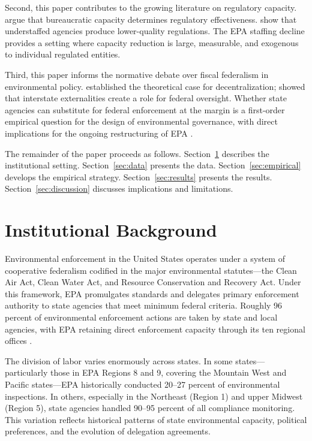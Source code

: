 \documentclass[12pt]{article}
\begin{document}
Second, this paper contributes to the growing literature on regulatory capacity. \citet{brehm1997working} argue that bureaucratic capacity determines regulatory effectiveness. \citet{carrigan2019regulatory} show that understaffed agencies produce lower-quality regulations. The EPA staffing decline provides a setting where capacity reduction is large, measurable, and exogenous to individual regulated entities.

Third, this paper informs the normative debate over fiscal federalism in environmental policy. \citet{oates1972fiscal} established the theoretical case for decentralization; \citet{sigman2005transboundary} showed that interstate externalities create a role for federal oversight. Whether state agencies can substitute for federal enforcement at the margin is a first-order empirical question for the design of environmental governance, with direct implications for the ongoing restructuring of EPA \citep{millimet2003environmental, woods2006primacy}.

The remainder of the paper proceeds as follows. Section~\ref{sec:background} describes the institutional setting. Section~\ref{sec:data} presents the data. Section~\ref{sec:empirical} develops the empirical strategy. Section~\ref{sec:results} presents the results. Section~\ref{sec:discussion} discusses implications and limitations.

\section{Institutional Background}\label{sec:background}

Environmental enforcement in the United States operates under a system of cooperative federalism codified in the major environmental statutes---the Clean Air Act, Clean Water Act, and Resource Conservation and Recovery Act. Under this framework, EPA promulgates standards and delegates primary enforcement authority to state agencies that meet minimum federal criteria. Roughly 96 percent of environmental enforcement actions are taken by state and local agencies, with EPA retaining direct enforcement capacity through its ten regional offices \citep{mintz2012enforcement}.

The division of labor varies enormously across states. In some states---particularly those in EPA Regions 8 and 9, covering the Mountain West and Pacific states---EPA historically conducted 20--27 percent of environmental inspections. In others, especially in the Northeast (Region 1) and upper Midwest (Region 5), state agencies handled 90--95 percent of all compliance monitoring. This variation reflects historical patterns of state environmental capacity, political preferences, and the evolution of delegation agreements.
\end{document}
